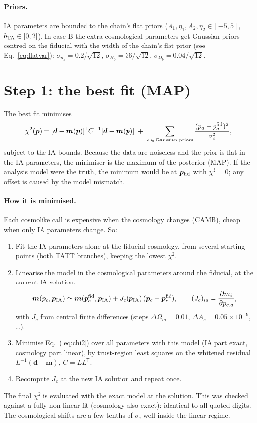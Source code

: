 \documentclass[11pt]{article}
\newcommand{\vd}{\bm{d}}
\newcommand{\vm}{\bm{m}}
\newcommand{\vp}{\bm{p}}
\newcommand{\tp}{^{\mathsf T}}
\begin{document}
\paragraph{Priors.} IA parameters are bounded to the chain's flat priors
($A_1, \eta_1, A_2, \eta_2 \in [-5, 5]$, $b_{\rm TA} \in [0, 2]$). In case B
the extra cosmological parameters get Gaussian priors centred on the fiducial
with the width of the chain's flat prior (see Eq.~\ref{eq:flatvar}):
$\sigma_{n_s} = 0.2/\sqrt{12}$, $\sigma_{H_0} = 36/\sqrt{12}$,
$\sigma_{\Omega_b} = 0.04/\sqrt{12}$.

\section{Step 1: the best fit (MAP)}

The best fit minimises
\begin{equation}
\chi^2(\vp) = [\vd - \vm(\vp)]\tp C^{-1}[\vd - \vm(\vp)]
\;+\; \sum_{a\,\in\,\text{Gaussian priors}}\frac{(p_a - p_a^{\rm fid})^2}{\sigma_a^2},
\label{eq:chi2}
\end{equation}
subject to the IA bounds. Because the data are noiseless and the prior is
flat in the IA parameters, the minimiser is the maximum of the posterior
(MAP). If the analysis model were the truth, the minimum would be at
$\vp_{\rm fid}$ with $\chi^2 = 0$; any offset is caused by the model
mismatch.

\paragraph{How it is minimised.} Each cosmolike call is expensive when the
cosmology changes (CAMB), cheap when only IA parameters change. So:
\begin{enumerate}[itemsep=1pt]
\item Fit the IA parameters alone at the fiducial cosmology, from several
  starting points (both TATT branches), keeping the lowest $\chi^2$.
\item Linearise the model in the cosmological parameters around the
  fiducial, at the current IA solution:
  \begin{equation}
  \vm(\vp_c, \vp_{\rm IA}) \simeq \vm(\vp_c^{\rm fid}, \vp_{\rm IA}) + J_c(\vp_{\rm IA})\,(\vp_c - \vp_c^{\rm fid}),
  \qquad (J_c)_{ia} = \frac{\partial m_i}{\partial p_{c,a}},
  \label{eq:lin}
  \end{equation}
  with $J_c$ from central finite differences (steps $\Delta\Omega_m = 0.01$,
  $\Delta A_s = 0.05\times10^{-9}$, \dots).
\item Minimise Eq.~(\ref{eq:chi2}) over all parameters with this model (IA
  part exact, cosmology part linear), by trust-region least squares on the
  whitened residual $L^{-1}(\vd - \vm)$, $C = LL\tp$.
\item Recompute $J_c$ at the new IA solution and repeat once.
\end{enumerate}
The final $\chi^2$ is evaluated with the exact model at the solution. This
was checked against a fully non-linear fit (cosmology also exact): identical
to all quoted digits. The cosmological shifts are a few tenths of $\sigma$,
well inside the linear regime.
\end{document}
